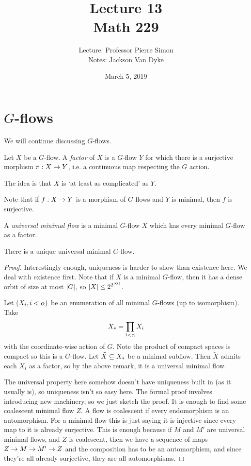 \documentclass{amsart}
\begin{document}
\title{Lecture 13\\Math 229}
\author{Lecture: Professor Pierre Simon\\Notes: Jackson Van Dyke}
\date{March 5, 2019}
\maketitle

\section{$G$-flows}

We will continue discussing $G$-flows.

\begin{defn}
Let $X$ be a $G$-flow. A \emph{factor} of $X$ is a $G$-flow $Y$ for which there is a
surjective morphism $\pi : X\rightarrow Y$, i.e. a continuous map respecting the $G$ action.
\end{defn}

The idea is that $X$ is `at least as complicated' as $Y$. 
\begin{rmk}
Note that if $f:X\rightarrow Y$ is a morphism of $G$ flows and $Y$ is minimal, then $f$ is
surjective.
\end{rmk}

\begin{defn}
A \emph{universal minimal flow} is a minimal $G$-flow $X$ which has every minimal $G$-flow
as a factor.
\end{defn}

\begin{thm}
There is a unique universal minimal $G$-flow.
\end{thm}
\begin{proof}
Interestingly enough, uniqueness is harder to show than existence here.
We deal with existence first. Note that if $X$ is a minimal $G$-flow, then it has a dense orbit of
size at most $\left| G \right|$, so $\left| X \right|\leq 2^{2^{\left| G \right|}}$.

Let $\left( X_i , i<\alpha \right)$ be an enumeration of all minimal $G$-flows (up to
isomorphism). 
Take
\begin{equation}
X_* = \prod_{i < \alpha} X_i
\end{equation}
with the coordinate-wise action of $G$. Note the product of compact spaces is compact so
this is a $G$-flow. Let $\tilde X \subseteq X_*$ be a minimal subflow.
Then $\tilde X$ admits each $X_i$ as a factor, so by the above remark, it is a universal
minimal flow.

The universal property here somehow doesn't have uniqueness built in (as it usually is),
so uniqueness isn't so easy here. The formal proof involves introducing new machinery, so
we just sketch the proof. It is enough to find some coalescent minimal flow $Z$.
A flow is coalescent if every endomorphism is an automorphism.
For a minimal flow this is just saying it is injective since every map to it is already
surjective.
This is enough because if $M$ and $M'$ are universal minimal flows, and $Z$ is coalescent,
then we have a sequence of maps $Z\rightarrow M \rightarrow M' \rightarrow Z$ and the composition has
to be an automorphism, and since they're all already surjective, they are all
automorphisms.
\end{proof}
\end{document}
